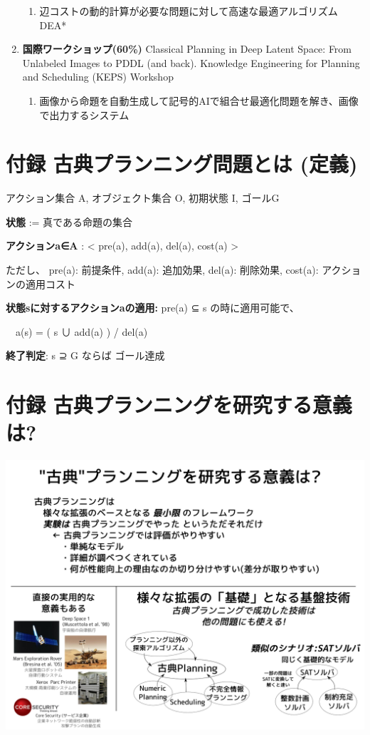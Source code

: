 \begin{smaller}
\begin{enumerate}
\begin{enumerate}
\item 辺コストの動的計算が必要な問題に対して高速な最適アルゴリズムDEA*
\end{enumerate}
\item \textbf{国際ワークショップ(60\%)} Classical Planning in Deep Latent Space: From Unlabeled Images to PDDL (and back).
Knowledge Engineering for Planning and Scheduling (KEPS) Workshop
\begin{enumerate}
\item 画像から命題を自動生成して記号的AIで組合せ最適化問題を解き、画像で出力するシステム
\end{enumerate}
\end{enumerate}
\end{smaller}

\section{付録 古典プランニング問題とは (定義)}
\label{sec-12}

アクション集合 A, オブジェクト集合 O, 初期状態 I, ゴールG

\textbf{状態} := 真である命題の集合

\textbf{アクションa∈A} : < pre(a), add(a), del(a), cost(a) >

ただし、 pre(a): 前提条件, add(a): 追加効果, del(a): 削除効果, cost(a): アクションの適用コスト

\textbf{状態sに対するアクションaの適用:} pre(a) ⊆ s の時に適用可能で、

　a(s) = ( s ∪ add(a) ) / del(a)

\textbf{終了判定}: s ⊇ G ならば ゴール達成

\section{付録 古典プランニングを研究する意義は?}
\label{sec-13}

\includegraphics{img/classical-meaning.png}

